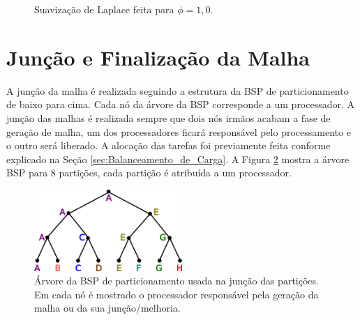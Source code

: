 \begin{figure}[!ht]
{	}
	\qquad	
	\caption{Suavização de Laplace feita para $\phi=1,0$.}
	\label{fig:laplace}
\end{figure}


\section{Junção e Finalização da Malha}

A junção da malha é realizada seguindo a estrutura da BSP de particionamento de baixo para cima. Cada nó da árvore da BSP corresponde a um processador. A junção das malhas é realizada sempre que dois nós irmãos acabam a fase de geração de malha, um dos processadores ficará responsável pelo processamento e o outro será liberado. A alocação das tarefas foi previamente feita conforme explicado na Seção \ref{sec:Balanceamento_de_Carga}. A Figura \ref{fig:arvore_juncao} mostra a árvore BSP para 8 partições, cada partição é atribuída a um processador.

\begin{figure}[!ht]
	\centering
	\includegraphics[width=0.5\textwidth]{fig/arvore.png}
	\caption{Árvore da BSP de particionamento usada na junção das partições. Em cada nó é mostrado o processador responsável pela geração da malha ou da sua junção/melhoria.}
	\label{fig:arvore_juncao}
\end{figure}


